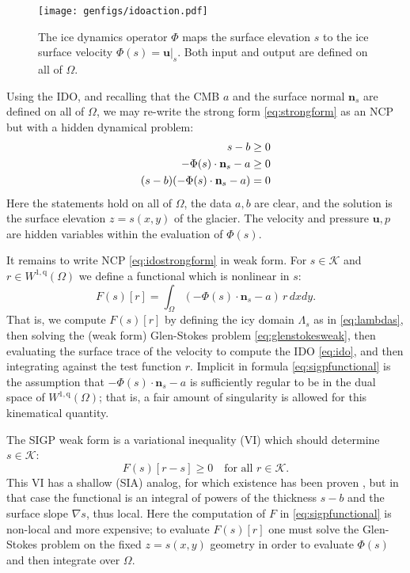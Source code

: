 \documentclass[letterpaper,final,12pt,reqno]{amsart}
\theoremstyle{claim}
\newcommand{\grad}{\nabla}
\newcommand{\bn}{\mathbf{n}}
\newcommand{\bu}{\mathbf{u}}
\newcommand{\qq}{{\text{q}}}
\numberwithin{equation}{section}
\numberwithin{figure}{section}
\numberwithin{table}{section}
\numberwithin{theorem}{section}
\begin{document}
\begin{figure}[t]
\begin{center}
\texttt{[image: genfigs/idoaction.pdf]}
\end{center}
\caption{The ice dynamics operator $\Phi$ maps the surface elevation $s$ to the ice surface velocity $\Phi(s)=\bu|_s$.  Both input and output are defined on all of $\Omega$.}
\label{fig:idoaction}
\end{figure}

Using the IDO, and recalling that the CMB $a$ and the surface normal $\bn_s$ are defined on all of $\Omega$, we may re-write the strong form \eqref{eq:strongform} as an NCP but with a hidden dynamical problem:
\begin{align}
s - b &\ge 0  \label{eq:idostrongform} \\
- \Phi(s) \cdot \bn_s - a &\ge 0 \notag \\
(s - b) (- \Phi(s) \cdot \bn_s - a) &= 0 \notag
\end{align}
Here the statements hold on all of $\Omega$, the data $a,b$ are clear, and the solution is the surface elevation $z=s(x,y)$ of the glacier.  The velocity and pressure $\bu,p$ are hidden variables within the evaluation of $\Phi(s)$.

It remains to write NCP \eqref{eq:idostrongform} in weak form.  For $s \in \mathcal{K}$ and $r \in W^{1,\qq}(\Omega)$ we define a functional which is nonlinear in $s$:
\begin{equation}
F(s)[r] = \int_\Omega (- \Phi(s) \cdot \bn_s - a)\, r \,dx dy. \label{eq:sigpfunctional}
\end{equation}
That is, we compute $F(s)[r]$ by defining the icy domain $\Lambda_s$ as in \eqref{eq:lambdas}, then solving the (weak form) Glen-Stokes problem \eqref{eq:glenstokesweak}, then evaluating the surface trace of the velocity to compute the IDO \eqref{eq:ido}, and then integrating against the test function $r$.  Implicit in formula \eqref{eq:sigpfunctional} is the assumption that $- \Phi(s) \cdot \bn_s - a$ is sufficiently regular to be in the dual space of $W^{1,\qq}(\Omega)$; that is, a fair amount of singularity is allowed for this kinematical quantity.

The SIGP weak form is a variational inequality (VI) \cite{KinderlehrerStampacchia1980} which should determine $s\in\mathcal{K}$:
\begin{equation}
F(s)[r - s] \ge 0 \quad \text{for all $r \in \mathcal{K}$.}  \label{eq:sigpweakform}
\end{equation}
This VI has a shallow (SIA) analog, for which existence has been proven \cite{JouvetBueler2012}, but in that case the functional is an integral of powers of the thickness $s-b$ and the surface slope $\grad s$, thus local.  Here the computation of $F$ in \eqref{eq:sigpfunctional} is non-local and more expensive; to evaluate $F(s)[r]$ one must solve the Glen-Stokes problem on the fixed $z=s(x,y)$ geometry in order to evaluate $\Phi(s)$ and then integrate over $\Omega$.
\end{document}
